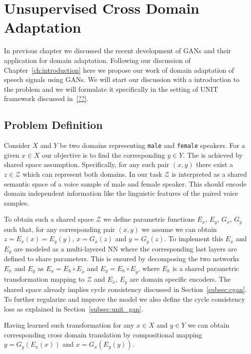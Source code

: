 \chapter{Unsupervised Cross Domain Adaptation}
\label{ch:unvc}
In previous chapter we discussed the recent development of GANs and their application for domain adaptation. Following our discussion of Chapter~\ref{ch:introduction} here we propose our work of domain adaptation of speech signals using GANs. We will start our discussion with a introduction to the problem and we will formulate it specifically in the setting of UNIT framework discussed in~\ref{??}. 

\section{Problem Definition}
\label{sec:prob_defn}
Consider $X$ and $Y$ be two domains representing \texttt{male} and \texttt{female} speakers. For a given $x\in X$ our objective is to find the corresponding $y\in Y$. The is achieved by shared space assumption. Specifically, for any such pair $(x,y)$ there exist a $z\in \mathcal{Z}$ which can represent both domains. In our task $\mathcal{Z}$ is interpreted as a shared semantic space of a voice sample of male and female speaker. This should encode domain independent information like the linguistic features of the paired voice samples. 

To obtain such a shared space $\mathcal{Z}$ we define parametric functions $E_x$, $E_y$, $G_x$, $G_y$ such that, for any corresponding pair $(x,y)$ we assume we can obtain $z=E_x(x)=E_y(y)$, $x=G_x(z)$ and $y=G_y(z)$. To implement this $E_x$ and $E_y$ are modeled as a multi-layered NN where the corresponding last layers are defined to share parameters. This is ensured by decomposing the two networks $E_x$ and $E_y$ as $E_x = E_h\circ E_{\tilde{x}}$ and $E_y = E_h\circ E_{\tilde{y}}$, where $E_h$ is a shared parametric transformation mapping to $\mathcal{Z}$ and $E_{\tilde{x}}$, $E_{\tilde{y}}$ are domain specific encoders.
The shared space already implies cycle consistency discussed in Section~\ref{subsec:cgan}. To further regularize and improve the model we also define the cycle consistency loss as explained in Section~\ref{subsec:unit_gan}.

Having learned such transformation for any $x\in X$ and $y\in Y$ we can obtain corresponding cross domain translation by compositional mapping $y = G_y(E_x(x))$ and $x = G_x(E_y(y))$. 

